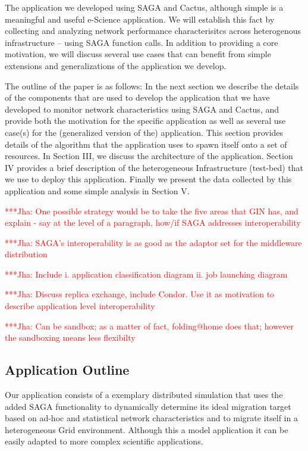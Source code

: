 \documentclass[conference,final]{IEEEtran}
\newcommand{\jhanote}[1]{ {\textcolor{red} { ***Jha: #1 }}}
\begin{document}
{ The application we
developed using SAGA and Cactus, although simple is a meaningful and
useful e-Science application.  We will establish this fact by
collecting and analyzing network performance characterisitcs across
heterogenous infrastructure -- using SAGA function calls. In addition
to providing a core motivation, we will discuss several use cases that
can benefit from simple extensions and generalizations of the
application we develop.

The outline of the paper is as follows: In the next section we
describe the details of the components that are used to develop the
application that we have developed to monitor network characteristics
using SAGA and Cactus, and provide both the motivation for the
specific application as well as several use case(s) for the
(generalized version of the) application. This section provides
details of the algorithm that the application uses to spawn itself
onto a set of resources.  In Section III, we discuss the architecture
of the application. Section IV provides a brief description of the
heterogeneous Infrastructure (test-bed) that we use to deploy this
application. Finally we present the data collected by this application
and some simple analysis in Section V.


\jhanote{One possible strategy would be to take the five areas that
  GIN has, and explain - say at the level of a paragraph, how/if SAGA
  addresses interoperability}
 
\jhanote{SAGA's interoperability is as good as the adaptor set for the
  middleware distribution}

\jhanote{Include i. application classification diagram ii. job
  launching diagram}

\jhanote{Discuss replica exchange, include Condor. Use it as
  motivation to describe application level interoperability}

\jhanote{Can be sandbox; as a matter of fact, folding@home does that;
  however the sandboxing means less flexibilty}

\subsection{Application Outline}

Our application consists of a exemplary distributed simulation that
uses the added SAGA functionality to dynamically determine its ideal
migration target based on ad-hoc and statistical network
characteristics and to migrate itself in a heterogeneous Grid
environment.  Although this a model application it can be easily
adapted to more complex scientific applications.  

}
\end{document}
